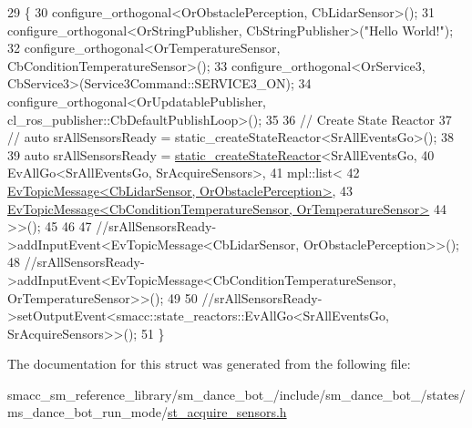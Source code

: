 \begin{DoxyCode}
29    \{
30       configure\_orthogonal<OrObstaclePerception, CbLidarSensor>();
31       configure\_orthogonal<OrStringPublisher, CbStringPublisher>(\textcolor{stringliteral}{"Hello World!"});
32       configure\_orthogonal<OrTemperatureSensor, CbConditionTemperatureSensor>();
33       configure\_orthogonal<OrService3, CbService3>(Service3Command::SERVICE3\_ON);
34       configure\_orthogonal<OrUpdatablePublisher, cl\_ros\_publisher::CbDefaultPublishLoop>();
35 
36       \textcolor{comment}{// Create State Reactor}
37       \textcolor{comment}{// auto srAllSensorsReady = static\_createStateReactor<SrAllEventsGo>();}
38 
39       \textcolor{keyword}{auto} srAllSensorsReady = \hyperlink{classsmacc_1_1SmaccState_a892be704b48f93bf5c35635d1a58ed54}{static\_createStateReactor}<SrAllEventsGo,
40                                                    EvAllGo<SrAllEventsGo, SrAcquireSensors>,
41                                                    mpl::list<
42                                                                
      \hyperlink{structsmacc_1_1default__events_1_1EvTopicMessage}{EvTopicMessage<CbLidarSensor, OrObstaclePerception>},
43                                                                
      \hyperlink{structsmacc_1_1default__events_1_1EvTopicMessage}{EvTopicMessage<CbConditionTemperatureSensor, OrTemperatureSensor>}
44                                                             >>();
45 
46       
47       \textcolor{comment}{//srAllSensorsReady->addInputEvent<EvTopicMessage<CbLidarSensor, OrObstaclePerception>>();}
48       \textcolor{comment}{//srAllSensorsReady->addInputEvent<EvTopicMessage<CbConditionTemperatureSensor,
       OrTemperatureSensor>>();}
49 
50       \textcolor{comment}{//srAllSensorsReady->setOutputEvent<smacc::state\_reactors::EvAllGo<SrAllEventsGo,
       SrAcquireSensors>>();}
51    \}
\end{DoxyCode}


The documentation for this struct was generated from the following file\+:\begin{DoxyCompactItemize}
\item 
smacc\+\_\+sm\+\_\+reference\+\_\+library/sm\+\_\+dance\+\_\+bot\+\_/include/sm\+\_\+dance\+\_\+bot\+\_/states/ms\+\_\+dance\+\_\+bot\+\_\+run\+\_\+mode/\hyperlink{sm__dance__bot__2_2include_2sm__dance__bot__2_2states_2ms__dance__bot__run__mode_2st__acquire__sensors_8h}{st\+\_\+acquire\+\_\+sensors.\+h}\end{DoxyCompactItemize}
